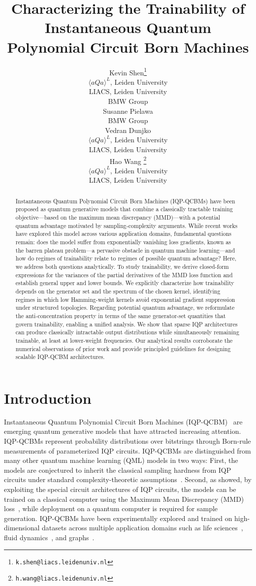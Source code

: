 \documentclass{article}
\title{Characterizing the Trainability of Instantaneous Quantum Polynomial Circuit Born Machines}
\author{%
  Kevin Shen\thanks{\texttt{k.shen@liacs.leidenuniv.nl}} \\
  $\langle aQa \rangle ^L$, Leiden University\\
  LIACS, Leiden University\\
  BMW Group\\
  \And
  Susanne Pielawa\\
  BMW Group\\
  \AND
  Vedran Dunjko\\
  $\langle aQa \rangle ^L$, Leiden University\\
  LIACS, Leiden University\\
  \And
  Hao Wang \thanks{\texttt{h.wang@liacs.leidenuniv.nl}}\\
  $\langle aQa \rangle ^L$, Leiden University\\
  LIACS, Leiden University\\
}
\theoremstyle{plain}
\theoremstyle{definition}
\theoremstyle{remark}
\begin{document}
\maketitle


\begin{abstract}
Instantaneous Quantum Polynomial Circuit Born Machines (IQP-QCBMs) have been proposed as quantum generative models that combine a classically tractable training objective—based on the maximum mean discrepancy (MMD)—with a potential quantum advantage motivated by sampling-complexity arguments. While recent works have explored this model across various application domains, fundamental questions remain: does the model suffer from exponentially vanishing loss gradients, known as the barren plateau problem—a pervasive obstacle in quantum machine learning—and how do regimes of trainability relate to regimes of possible quantum advantage? Here, we address both questions analytically. To study trainability, we derive closed-form expressions for the variances of the partial derivatives of the MMD loss function and establish general upper and lower bounds. We explicitly characterize how trainability depends on the generator set and the spectrum of the chosen kernel, identifying regimes in which low Hamming-weight kernels avoid exponential gradient suppression under structured topologies. Regarding potential quantum advantage, we reformulate the anti-concentration property in terms of the same generator-set quantities that govern trainability, enabling a unified analysis. We show that sparse IQP architectures can produce classically intractable output distributions while simultaneously remaining trainable, at least at lower-weight frequencies. Our analytical results corroborate the numerical observations of prior work and provide principled guidelines for designing scalable IQP-QCBM architectures.
\end{abstract}



\section{Introduction}
Instantaneous Quantum Polynomial Circuit Born Machines (IQP-QCBM)~\citep{shepherd09,Liu18} are emerging quantum generative models that have attracted increasing attention. IQP-QCBMs represent probability distributions over bitstrings through Born-rule measurements of parameterized IQP circuits. IQP-QCBMs are distinguished from many other quantum machine learning (QML) models in two ways: First, the models are conjectured to inherit the classical sampling hardness from IQP circuits under standard complexity-theoretic assumptions~\citep{Bremner10,Bremner16}. Second, as \citet{recioarmengol25} showed, by exploiting the special circuit architectures of IQP circuits, the models can be trained on a classical computer using the Maximum Mean Discrepancy (MMD) loss~\citep{gretton12}, while deployment on a quantum computer is required for sample generation. IQP-QCBMs have been experimentally explored and trained on high-dimensional datasets across multiple application domains such as life sciences~\citep{11250278}, fluid dynamics~\citep{liu2026generativequantumutilitycorrelationcomplexity}, and graphs~\citep{jcdk-q3xc}. 
\end{document}
